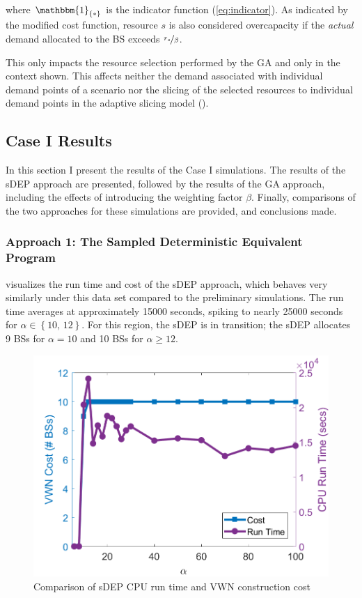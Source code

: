 \documentclass[12pt,dvipsnames]{report}
\newcommand{\ind}[1]{\mathbbm{1}_{\left\{ #1 \right\}}}
\begin{document}
\noindent where $\ind{*}$ is the indicator function (\cref{eq:indicator}).  As indicated by the modified cost function, resource $s$ is also considered overcapacity if the \emph{actual} demand allocated to the BS exceeds $\nicefrac{r_s}{\beta}$.

This only impacts the resource selection performed by the GA and only in the context shown.  This affects neither the demand associated with individual demand points of a scenario nor the slicing of the selected resources to individual demand points in the adaptive slicing model ().

\subsection{Case I Results} \label{subsec:caseI_results}

In this section I present the results of the Case I simulations.  The results of the sDEP approach are presented, followed by the results of the GA approach, including the effects of introducing the weighting factor $\beta$.  Finally, comparisons of the two approaches for these simulations are provided, and conclusions made.

\subsubsection{Approach 1: The Sampled Deterministic Equivalent Program}

 visualizes the run time and cost of the sDEP approach, which behaves very similarly under this data set compared to the preliminary simulations.  The run time averages at approximately 15000 seconds, spiking to nearly 25000 seconds for $\alpha \in \left\{ 10,\, 12 \right\}$.  For this region, the sDEP is in transition; the sDEP allocates 9 BSs for $\alpha = 10$ and 10 BSs for $\alpha \geq 12$.

\begin{figure}[htp]
	\centering
	\includegraphics[height=0.4\textheight]{Figures/CaseI_sDEPComparisonCostRuntime}
	\caption[Comparison of Case I sDEP approach run time and cost]{Comparison of sDEP CPU run time and VWN construction cost}
	\label{fig:CaseI_sDEPComparisonCostRunTime}
\end{figure}
\end{document}
